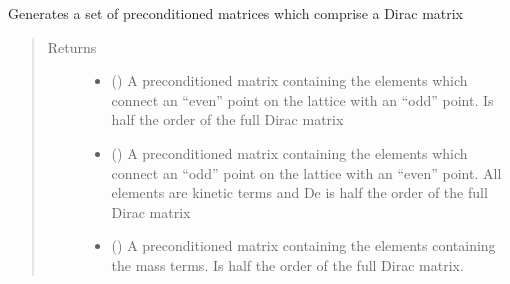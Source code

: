\documentclass[letterpaper,10pt,english]{sphinxmanual}
\begin{document}
\label{\detokenize{index:module-dirac_generator}}

\begin{fulllineitems}
\label{\detokenize{index:dirac_generator.gen_dirac}}
Generates a set of preconditioned matrices which comprise a
Dirac matrix
\begin{quote}\begin{description}
\item[{Returns}] \leavevmode
\begin{itemize}
\item {} 
 () \textendash{} A preconditioned matrix containing the elements which connect
an “even” point on the lattice with an “odd” point. Is half the
order of the full Dirac matrix

\item {} 
 () \textendash{} A preconditioned matrix containing the elements which connect
an “odd” point on the lattice with an “even” point. All
elements are kinetic terms and De is half the order of the full
Dirac matrix

\item {} 
 () \textendash{} A preconditioned matrix containing the elements containing the
mass terms. Is half the order of the full Dirac matrix.

\end{itemize}


\end{description}\end{quote}

\end{fulllineitems}

\end{document}

